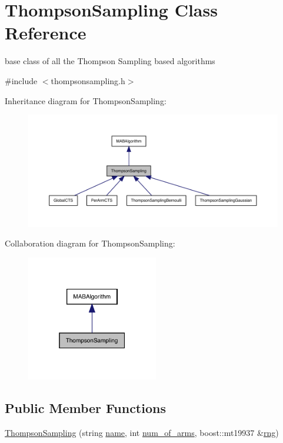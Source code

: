 \hypertarget{class_thompson_sampling}{}\section{Thompson\+Sampling Class Reference}
\label{class_thompson_sampling}


base class of all the Thompson Sampling based algorithms  




{\ttfamily \#include $<$thompsonsampling.\+h$>$}



Inheritance diagram for Thompson\+Sampling\+:
\nopagebreak
\begin{figure}[H]
\begin{center}
\leavevmode
\includegraphics[width=350pt]{class_thompson_sampling__inherit__graph}
\end{center}
\end{figure}


Collaboration diagram for Thompson\+Sampling\+:
\nopagebreak
\begin{figure}[H]
\begin{center}
\leavevmode
\includegraphics[width=163pt]{class_thompson_sampling__coll__graph}
\end{center}
\end{figure}
\subsection*{Public Member Functions}
\begin{DoxyCompactItemize}
\item 
\mbox{\hyperlink{class_thompson_sampling_a6a36c5be2a981c8cf21bd3bfbb66f9e8}{Thompson\+Sampling}} (string \mbox{\hyperlink{class_m_a_b_algorithm_a77b10ecc4b49d519c557f65358167b82}{name}}, int \mbox{\hyperlink{class_m_a_b_algorithm_a340fa9e83e85b092f2c6125fc4e8549b}{num\+\_\+of\+\_\+arms}}, boost\+::mt19937 \&\mbox{\hyperlink{class_thompson_sampling_a1b66efa9bb0912df92975147f8923216}{rng}})
\end{DoxyCompactItemize}
